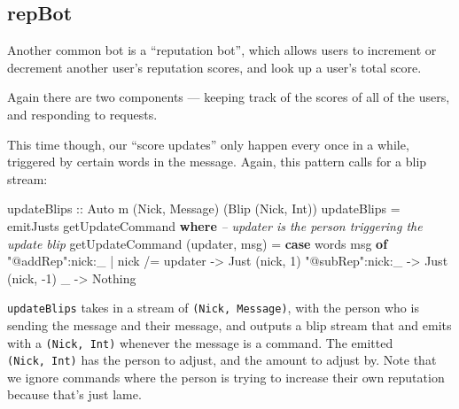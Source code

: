 \documentclass[]{article}
\newenvironment{Shaded}{\begin{snugshade}}{\end{snugshade}}
\newcommand{\CommentTok}[1]{\textcolor[rgb]{0.56,0.35,0.01}{\textit{#1}}}
\newcommand{\DataTypeTok}[1]{\textcolor[rgb]{0.13,0.29,0.53}{#1}}
\newcommand{\DecValTok}[1]{\textcolor[rgb]{0.00,0.00,0.81}{#1}}
\newcommand{\FunctionTok}[1]{\textcolor[rgb]{0.00,0.00,0.00}{#1}}
\newcommand{\KeywordTok}[1]{\textcolor[rgb]{0.13,0.29,0.53}{\textbf{#1}}}
\newcommand{\NormalTok}[1]{#1}
\newcommand{\OtherTok}[1]{\textcolor[rgb]{0.56,0.35,0.01}{#1}}
\newcommand{\StringTok}[1]{\textcolor[rgb]{0.31,0.60,0.02}{#1}}
\begin{document}
\hypertarget{repbot}{%
\subsection{repBot}\label{repbot}}

Another common bot is a ``reputation bot'', which allows users to increment or
decrement another user's reputation scores, and look up a user's total score.

Again there are two components --- keeping track of the scores of all of the
users, and responding to requests.

This time though, our ``score updates'' only happen every once in a while,
triggered by certain words in the message. Again, this pattern calls for a blip
stream:

\begin{Shaded}
\begin{Highlighting}[]
\OtherTok{updateBlips ::} \DataTypeTok{Auto}\NormalTok{ m (}\DataTypeTok{Nick}\NormalTok{, }\DataTypeTok{Message}\NormalTok{) (}\DataTypeTok{Blip}\NormalTok{ (}\DataTypeTok{Nick}\NormalTok{, }\DataTypeTok{Int}\NormalTok{))}
\NormalTok{updateBlips }\FunctionTok{=}\NormalTok{ emitJusts getUpdateCommand}
  \KeywordTok{where}
    \CommentTok{-- updater is the person triggering the update blip}
\NormalTok{    getUpdateCommand (updater, msg) }\FunctionTok{=}
      \KeywordTok{case}\NormalTok{ words msg }\KeywordTok{of}
        \StringTok{"@addRep"}\FunctionTok{:}\NormalTok{nick}\FunctionTok{:}\NormalTok{_ }\FunctionTok{|}\NormalTok{ nick }\FunctionTok{/=}\NormalTok{ updater }\OtherTok{->} \DataTypeTok{Just}\NormalTok{ (nick, }\DecValTok{1}\NormalTok{)}
        \StringTok{"@subRep"}\FunctionTok{:}\NormalTok{nick}\FunctionTok{:}\NormalTok{_                   }\OtherTok{->} \DataTypeTok{Just}\NormalTok{ (nick, }\FunctionTok{-}\DecValTok{1}\NormalTok{)}
\NormalTok{        _                                  }\OtherTok{->} \DataTypeTok{Nothing}
\end{Highlighting}
\end{Shaded}

\texttt{updateBlips} takes in a stream of \texttt{(Nick,\ Message)}, with the
person who is sending the message and their message, and outputs a blip stream
that and emits with a \texttt{(Nick,\ Int)} whenever the message is a command.
The emitted \texttt{(Nick,\ Int)} has the person to adjust, and the amount to
adjust by. Note that we ignore commands where the person is trying to increase
their own reputation because that's just lame.
\end{document}
